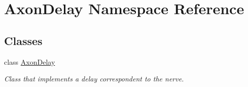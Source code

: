 \hypertarget{namespace_axon_delay}{}\section{Axon\+Delay Namespace Reference}
\label{namespace_axon_delay}
\subsection*{Classes}
\begin{DoxyCompactItemize}
\item 
class \hyperlink{class_axon_delay_1_1_axon_delay}{Axon\+Delay}
\begin{DoxyCompactList}\small\item\em Class that implements a delay correspondent to the nerve. \end{DoxyCompactList}\end{DoxyCompactItemize}
